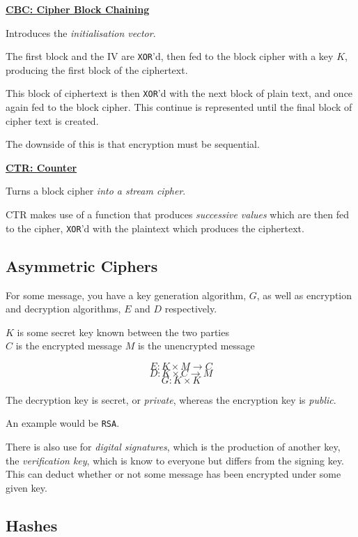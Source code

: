 \documentclass{article}
\begin{document}
\textbf{\underline{CBC: Cipher Block Chaining}}

Introduces the \textit{initialisation vector}.

The first block and the IV are \texttt{XOR}'d, then fed to the block cipher with a key $K$, producing the first block of the ciphertext.

This block of ciphertext is then \texttt{XOR}'d with the next block of plain text, and once again fed to the block cipher. This continue is represented until the final block of cipher text is created.

The downside of this is that encryption must be sequential.

\textbf{\underline{CTR: Counter}}

Turns a block cipher \textit{into a stream cipher}.

CTR makes use of a function that produces \textit{successive values} which are then fed to the cipher, \texttt{XOR}'d with the plaintext which produces the ciphertext.

\subsection{Asymmetric Ciphers}

For some message, you have a key generation algorithm, $G$, as well as
encryption and decryption algorithms, $E$ and $D$ respectively.

\vspace{.5cm}
\begin{center}
  $K$ is some secret key known between the two parties\\
  $C$ is the encrypted message $M$ is the unencrypted message
\end{center}

\[ E : K \times M \rightarrow C\]
\[ D : K \times C \rightarrow M\]
\[ G : K \times K \]

The decryption key is secret, or \textit{private}, whereas the
encryption key is \textit{public}.

An example would be \texttt{RSA}.
 
There is also use for \textit{digital signatures}, which is the
production of another key, the \textit{verification key}, which is
know to everyone but differs from the signing key. This can deduct
whether or not some message has been encrypted under some given key.

\subsection{Hashes}
\end{document}
